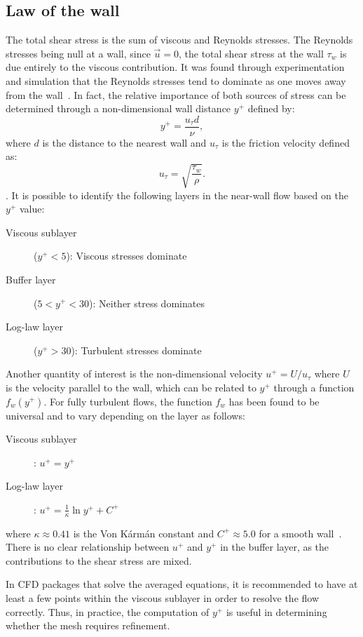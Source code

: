 \subsection{Law of the wall}
%
The total shear stress is the sum of viscous and Reynolds stresses. The Reynolds stresses being null at a wall, since $\vec{u} = 0$, the total shear stress at the wall $\tau_w$ is due entirely to the viscous contribution. It was found through experimentation and simulation that the Reynolds stresses tend to dominate as one moves away from the wall~\cite{pope2001turbulent}. In fact, the relative importance of both sources of stress can be determined through a non-dimensional wall distance $y^+$ defined by:
\begin{equation*}
    y^+ = \frac{u_\tau d}{\nu},
\end{equation*}
where $d$ is the distance to the nearest wall and $u_\tau$ is the friction velocity defined as:
\begin{equation*}
    u_\tau = \sqrt{\frac{\tau_w}\rho}.
\end{equation*}.
It is possible to identify the following layers in the near-wall flow based on the $y^+$ value:
\begin{description}
    \item[Viscous sublayer] ($y^+ < 5$): Viscous stresses dominate
    \item[Buffer layer] ($5 < y^+ < 30$): Neither stress dominates
    \item[Log-law layer] ($y^+ > 30$): Turbulent stresses dominate
\end{description}
Another quantity of interest is the non-dimensional velocity $u^+ = U/u_\tau$ where $U$ is the velocity parallel to the wall, which can be related to $y^+$ through a function $f_w(y^+)$. For fully turbulent flows, the function $f_w$ has been found to be universal and to vary depending on the layer as follows:
\begin{description}
    \item[Viscous sublayer]: $u^+ = y^+$
    \item[Log-law layer]: $u^+ = \frac{1}{\kappa} \ln y^+ + C^+$
\end{description}
where $\kappa \approx 0.41 $ is the Von Kármán constant and $C^+\approx5.0$ for a smooth wall~\cite{pope2001turbulent}. There is no clear relationship between $u^+$ and $y^+$ in the buffer layer, as the contributions to the shear stress are mixed.

In CFD packages that solve the averaged equations, it is recommended to have at least a few points within the viscous sublayer in order to resolve the flow correctly. Thus, in practice, the computation of $y^+$ is useful in determining whether the mesh requires refinement.
%
